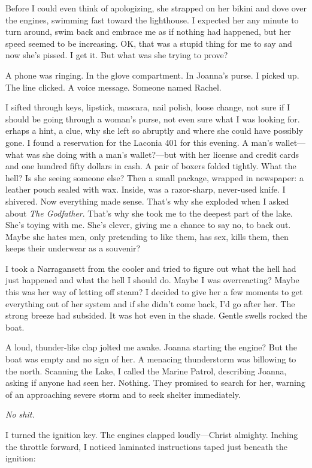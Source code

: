Before I could even think of apologizing, she strapped on her bikini and
dove over the engines, swimming fast toward the lighthouse. I expected
her any minute to turn around, swim back and embrace me as if nothing
had happened, but her speed seemed to be increasing. OK, that was a
stupid thing for me to say and now she's pissed. I get it. But what was
she trying to prove?

A phone was ringing. In the glove compartment. In Joanna's purse. I
picked up. The line clicked. A voice message. Someone named Rachel.

I sifted through keys, lipstick, mascara, nail polish, loose change, not
sure if I should be going through a woman's purse, not even sure what I
was looking for. erhaps a hint, a clue, why she left so abruptly and
where she could have possibly gone. I found a reservation for the
Laconia 401 for this evening. A man's wallet---what was she doing with a
man's wallet?---but with her license and credit cards and one hundred
fifty dollars in cash. A pair of boxers folded tightly. What the hell?
Is she seeing someone else? Then a small package, wrapped in newspaper:
a leather pouch sealed with wax. Inside, was a razor-sharp, never-used
knife. I shivered. Now everything made sense. That's why she exploded
when I asked about \emph{The Godfather}. That's why she took me to the
deepest part of the lake. She's toying with me. She's clever, giving me
a chance to say no, to back out. Maybe she hates men, only pretending to
like them, has sex, kills them, then keeps their underwear as a
souvenir?

I took a Narragansett from the cooler and tried to figure out what the
hell had just happened and what the hell I should do. Maybe I was
overreacting? Maybe this was her way of letting off steam? I decided to
give her a few moments to get everything out of her system and if she
didn't come back, I'd go after her. The strong breeze had subsided. It
was hot even in the shade. Gentle swells rocked the boat.

A loud, thunder-like clap jolted me awake. Joanna starting the engine?
But the boat was empty and no sign of her. A menacing thunderstorm was
billowing to the north. Scanning the Lake, I called the Marine Patrol,
describing Joanna, asking if anyone had seen her. Nothing. They promised
to search for her, warning of an approaching severe storm and to seek
shelter immediately.

\emph{No shit.}

I turned the ignition key. The engines clapped loudly---Christ almighty.
Inching the throttle forward, I noticed laminated instructions taped
just beneath the ignition:

